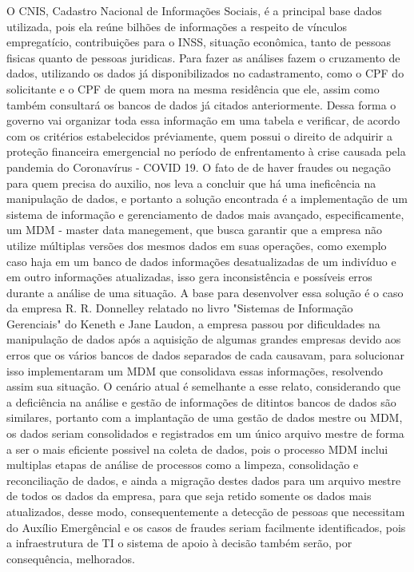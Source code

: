 \documentclass[12pt]{article}
\begin{document}
	O CNIS, Cadastro Nacional de Informações Sociais, é a principal base dados utilizada, pois ela reúne bilhões de informações a respeito de vínculos empregatício, contribuições para o INSS, situação econômica, tanto de pessoas fisicas quanto de pessoas juridicas. Para fazer as análises fazem o cruzamento de dados, utilizando os dados já disponibilizados no cadastramento, como o CPF do solicitante e o CPF de quem mora na mesma residência que ele, assim como também consultará os bancos de dados já citados anteriormente. Dessa forma o governo vai organizar toda essa informação em uma tabela e verificar, de acordo com os critérios estabelecidos préviamente, quem possui o direito de adquirir a proteção financeira emergencial no período de enfrentamento à crise causada pela pandemia do Coronavírus - COVID 19.
\linebreak
\linebreak
	O fato de de haver fraudes ou negação para quem precisa do auxilio, nos leva a concluir que há uma ineficência na manipulação de dados, e portanto a solução encontrada é a implementação de um sistema de informação e gerenciamento de dados mais avançado, especificamente, um MDM - master data manegement, que busca garantir que a empresa não utilize múltiplas versões dos mesmos dados em suas operações, como exemplo caso haja em um banco de dados informações desatualizadas de um indivíduo e em outro informações atualizadas, isso gera inconsistência e possíveis erros durante a análise de uma situação.
\linebreak
\linebreak
	A base para desenvolver essa solução é o caso da empresa R. R. Donnelley relatado no livro "Sistemas de Informação Gerenciais" do Keneth e Jane Laudon, a empresa passou por dificuldades na manipulação de dados após a aquisição de algumas grandes empresas devido aos erros que os vários bancos de dados separados de cada causavam, para solucionar isso implementaram um MDM que consolidava essas informações, resolvendo assim sua situação.
\linebreak
\linebreak
	O cenário atual é semelhante a esse relato, considerando que a deficiência na análise e gestão de informações de ditintos bancos de dados são similares, portanto com a implantação de uma gestão de dados mestre ou MDM, os dados seriam consolidados e registrados em um único arquivo mestre de forma a ser o mais eficiente possivel na coleta de dados, pois o processo MDM inclui multiplas etapas de análise de processos como a limpeza, consolidação e reconciliação de dados, e ainda a migração destes dados para um arquivo mestre de todos os dados da empresa, para que seja retido somente os dados mais atualizados, desse modo, consequentemente a detecção de pessoas que necessitam do Auxílio Emergêncial e os casos de fraudes seriam facilmente identificados, pois a infraestrutura de TI o sistema de apoio à decisão também serão, por consequência, melhorados.
\end{document}
